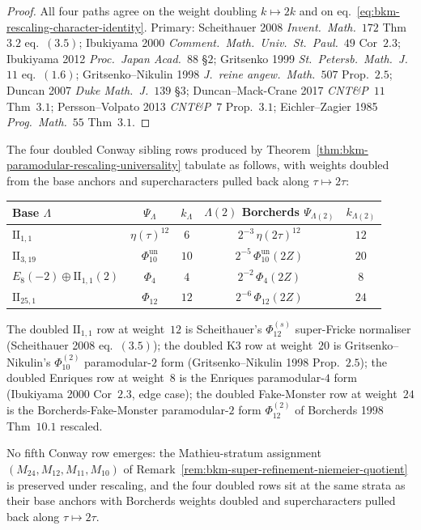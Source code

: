 \begin{proof}
All four paths agree on the weight doubling $k\mapsto 2k$ and on
eq.~\eqref{eq:bkm-rescaling-character-identity}.
Primary: Scheithauer 2008 \emph{Invent.~Math.}~$172$ Thm~$3.2$
eq.~$(3.5)$; Ibukiyama 2000
\emph{Comment.~Math.~Univ.~St.~Paul.}~$49$ Cor~$2.3$; Ibukiyama 2012
\emph{Proc.~Japan Acad.}~$88$ \S$2$; Gritsenko 1999
\emph{St.~Petersb.~Math.~J.}~$11$ eq.~$(1.6)$; Gritsenko--Nikulin
1998 \emph{J.~reine angew.~Math.}~$507$ Prop.~$2.5$;
Duncan 2007 \emph{Duke Math.~J.}~$139$ \S$3$;
Duncan--Mack-Crane 2017 \emph{CNT\&P}~$11$ Thm~$3.1$;
Persson--Volpato 2013 \emph{CNT\&P}~$7$ Prop.~$3.1$;
Eichler--Zagier 1985 \emph{Prog.~Math.}~$55$ Thm~$3.1$.
\end{proof}

\begin{remark}
\label{rem:bkm-doubled-sibling-table}
The four doubled Conway sibling rows produced by
Theorem~\ref{thm:bkm-paramodular-rescaling-universality} tabulate
as follows, with weights doubled from the base anchors and
supercharacters pulled back along $\tau\mapsto 2\tau$:
\begin{center}
\footnotesize
\renewcommand{\arraystretch}{1.15}
\begin{tabular}{lcccc}
\toprule
Base $\Lambda$ & $\Psi_\Lambda$ & $k_\Lambda$ &
 $\Lambda(2)$ Borcherds $\Psi_{\Lambda(2)}$ & $k_{\Lambda(2)}$ \\
\midrule
$\mathrm{II}_{1,1}$ & $\eta(\tau)^{12}$ & $6$ &
 $2^{-3}\,\eta(2\tau)^{12}$ & $12$ \\
$\mathrm{II}_{3,19}$ & \(\Phi_{10}^{\mathrm{un}}\) & $10$ &
 \(2^{-5}\,\Phi_{10}^{\mathrm{un}}(2Z)\) & $20$ \\
$E_8(-2){\oplus}\mathrm{II}_{1,1}(2)$ & $\Phi_4$ & $4$ &
 $2^{-2}\,\Phi_4(2Z)$ & $8$ \\
$\mathrm{II}_{25,1}$ & $\Phi_{12}$ & $12$ &
 $2^{-6}\,\Phi_{12}(2Z)$ & $24$ \\
\bottomrule
\end{tabular}
\end{center}
The doubled $\mathrm{II}_{1,1}$ row at weight~$12$ is Scheithauer's
$\Phi_{12}^{(s)}$ super-Fricke normaliser
(Scheithauer 2008 eq.~$(3.5)$); the doubled K3 row at weight~$20$
is Gritsenko--Nikulin's $\Phi_{10}^{(2)}$ paramodular-$2$ form
(Gritsenko--Nikulin 1998 Prop.~$2.5$); the doubled Enriques row at
weight~$8$ is the Enriques paramodular-$4$ form
(Ibukiyama 2000 Cor~$2.3$, edge case); the doubled Fake-Monster
row at weight~$24$ is the Borcherds-Fake-Monster paramodular-$2$
form $\Phi_{12}^{(2)}$ of Borcherds 1998 Thm~$10.1$ rescaled.

No fifth Conway row emerges: the Mathieu-stratum assignment
$(M_{24},M_{12},M_{11},M_{10})$ of
Remark~\ref{rem:bkm-super-refinement-niemeier-quotient} is
preserved under rescaling, and the four doubled rows sit at the
same strata as their base anchors with Borcherds weights doubled
and supercharacters pulled back along $\tau\mapsto 2\tau$.
\end{remark}


